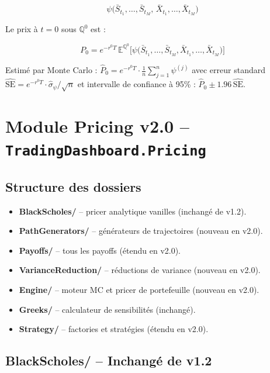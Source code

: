 \documentclass[a4paper,11pt]{article}
\begin{document}
\[
  \psi\!\bigl(\bar{S}_{t_1}, \dots, \bar{S}_{t_M},\, \bar{X}_{t_1}, \dots, \bar{X}_{t_M}\bigr)
\]

Le prix \`a $t=0$ sous $\mathbb{Q}^0$ est :

\[
  P_0 = e^{-r^0 T}\,\mathbb{E}^{\mathbb{Q}^0}\!\bigl[\psi\bigl(\bar{S}_{t_1}, \dots, \bar{S}_{t_M},
  \bar{X}_{t_1}, \dots, \bar{X}_{t_M}\bigr)\bigr]
\]

Estim\'e par Monte Carlo : $\hat{P}_0 = e^{-r^0 T} \cdot \frac{1}{n}\sum_{j=1}^n
\psi^{(j)}$ avec erreur standard $\widehat{\text{SE}} = e^{-r^0 T}\cdot\hat{\sigma}_\psi/\sqrt{n}$
et intervalle de confiance \`a 95\% : $\hat{P}_0 \pm 1.96\,\widehat{\text{SE}}$.

\newpage
\section{Module Pricing v2.0 -- \texttt{TradingDashboard.Pricing}}

\subsection{Structure des dossiers}

\begin{itemize}[leftmargin=1.5em]
  \item \textbf{BlackScholes/} -- pricer analytique vanilles (inchang\'e de v1.2).
  \item \textbf{PathGenerators/} -- g\'en\'erateurs de trajectoires (nouveau en v2.0).
  \item \textbf{Payoffs/} -- tous les payoffs (\'etendu en v2.0).
  \item \textbf{VarianceReduction/} -- r\'eductions de variance (nouveau en v2.0).
  \item \textbf{Engine/} -- moteur MC et pricer de portefeuille (nouveau en v2.0).
  \item \textbf{Greeks/} -- calculateur de sensibilit\'es (inchang\'e).
  \item \textbf{Strategy/} -- factories et strat\'egies (\'etendu en v2.0).
\end{itemize}

\subsection{BlackScholes/ -- Inchang\'e de v1.2}
\end{document}
